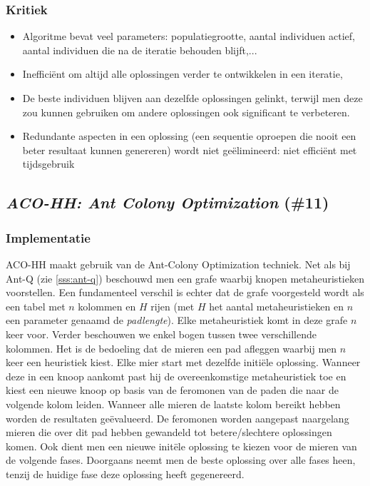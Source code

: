 \subsubsection{Kritiek}
\begin{itemize}
 \item Algoritme bevat veel parameters: populatiegrootte, aantal individuen actief, aantal individuen die na de iteratie behouden blijft,...
 \item Ineffici\"ent om altijd alle oplossingen verder te ontwikkelen in een iteratie,
 \item De beste individuen blijven aan dezelfde oplossingen gelinkt, terwijl men deze zou kunnen gebruiken om andere oplossingen ook significant te verbeteren.
 \item Redundante aspecten in een oplossing (een sequentie oproepen die nooit een beter resultaat kunnen genereren) wordt niet ge\"elimineerd: niet effici\"ent met tijdsgebruik
\end{itemize}
\subsection{\emph{ACO-HH: Ant Colony Optimization} (\#11)}
\label{sss:aco-hh}
\subsubsection{Implementatie}
ACO-HH\cite{chesc-aco-hh} maakt gebruik van de Ant-Colony Optimization\cite{hom/aco} techniek. Net als bij Ant-Q (zie \ref{sss:ant-q}) beschouwd men een grafe waarbij knopen metaheuristieken voorstellen. Een fundamenteel verschil is echter dat de grafe voorgesteld wordt als een tabel met $n$ kolommen en $H$ rijen (met $H$ het aantal metaheuristieken en $n$ een parameter genaamd de \emph{padlengte}). Elke metaheuristiek komt in deze grafe $n$ keer voor. Verder beschouwen we enkel bogen tussen twee verschillende kolommen. Het is de bedoeling dat de mieren een pad afleggen waarbij men $n$ keer een heuristiek kiest. Elke mier start met dezelfde initi\"ele oplossing. Wanneer deze in een knoop aankomt past hij de overeenkomstige metaheuristiek toe en kiest een nieuwe knoop op basis van de feromonen van de paden die naar de volgende kolom leiden. Wanneer alle mieren de laatste kolom bereikt hebben worden de resultaten ge\"evalueerd. De feromonen worden aangepast naargelang mieren die over 
dit pad hebben gewandeld tot betere/slechtere oplossingen komen. Ook dient men een nieuwe init\"ele oplossing te kiezen voor de mieren van de volgende fases. Doorgaans neemt men de beste oplossing over alle fases heen, tenzij de huidige fase deze oplossing heeft gegenereerd.
